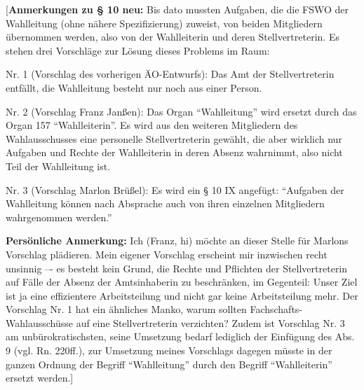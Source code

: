 \documentclass[%
draft,%
multilinesections%
]{fswo}
\newcommand\bemFr[1]{{\color{Red}[#1]}}
\newcommand\bemFr[1]{}%
\begin{document}
\bemFr{\textbf{Anmerkungen zu § 10 neu:}
Bis dato mussten Aufgaben, die die FSWO der Wahlleitung (ohne nähere Spezifizierung) zuweist, von beiden Mitgliedern übernommen werden, also von der Wahlleiterin und deren Stellvertreterin.
Es stehen drei Vorschläge zur Lösung dieses Problems im Raum:

Nr. 1 (Vorschlag des vorherigen ÄO-Entwurfs):
Das Amt der Stellvertreterin entfällt, die Wahlleitung besteht nur noch aus einer Person.

Nr. 2 (Vorschlag Franz Janßen):
Das Organ \enquote{Wahlleitung} wird ersetzt durch das Organ 157 \enquote{Wahlleiterin}.
Es wird aus den weiteren Mitgliedern des Wahlausschusses eine personelle Stellvertreterin gewählt,
die aber wirklich nur Aufgaben und Rechte der Wahlleiterin in deren Absenz wahrnimmt, also nicht Teil der Wahlleitung ist.

Nr. 3 (Vorschlag Marlon Brüßel):
Es wird ein § 10 IX angefügt: \enquote{Aufgaben der Wahlleitung können nach Absprache auch von ihren einzelnen Mitgliedern wahrgenommen werden.}

\textbf{Persönliche Anmerkung:} Ich (Franz, hi) möchte an dieser Stelle für Marlons Vorschlag plädieren.
Mein eigener Vorschlag erscheint mir inzwischen recht unsinnig –- es besteht kein Grund,
die Rechte und Pflichten der Stellvertreterin auf Fälle der Absenz der Amtsinhaberin zu beschränken, im Gegenteil:
Unser Ziel ist ja eine effizientere Arbeitsteilung und nicht gar keine Arbeitsteilung mehr.
Der Vorschlag Nr. 1 hat ein ähnliches Manko, warum sollten Fachschafts-Wahlausschüsse auf eine Stellvertreterin verzichten?
Zudem ist Vorschlag Nr. 3 am unbürokratischsten, seine Umsetzung bedarf lediglich der Einfügung des Abs. 9 (vgl. Rn. 220ff.),
zur Umsetzung meines Vorschlags dagegen müsste in der ganzen Ordnung der Begriff \enquote{Wahlleitung} durch den Begriff \enquote{Wahlleiterin} ersetzt werden.}
\end{document}
